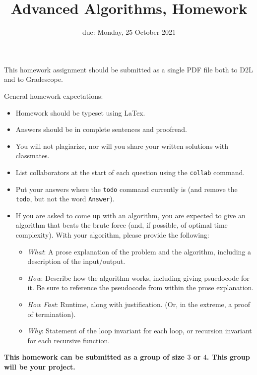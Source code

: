 \documentclass{article}
\title{Advanced Algorithms, Homework \hwnum}
\author{\todo{Your Name Here}}
\date{due: Monday, 25 October 2021}
\begin{document}
\maketitle

This homework assignment should be
submitted as a single PDF file both to D2L and to Gradescope.

General homework expectations:
\begin{itemize}
    \item Homework should be typeset using LaTex.
    \item Answers should be in complete sentences and proofread.
    \item You will not plagiarize, nor will you share your written solutions
        with classmates.
    \item List collaborators at the start of each question using the
        \texttt{collab} command.
    \item Put your answers where the \texttt{todo} command currently is (and
        remove the \texttt{todo}, but not the word \texttt{Answer}).
    \item If you are asked to come up with an algorithm, you are
        expected to give an algorithm that beats the brute force (and, if possible, of
        optimal time complexity). With your algorithm, please provide the following:
        \begin{itemize}
            \item \emph{What}: A prose explanation of the problem and the algorithm,
                including a description of the input/output.
            \item \emph{How}: Describe how the algorithm works, including giving
                psuedocode for it.  Be sure to reference the pseudocode
                from within the prose explanation.
            \item \emph{How Fast}: Runtime, along with justification.  (Or, in the
                extreme, a proof of termination).
            \item \emph{Why}: Statement of the loop invariant for each loop, or
                recursion invariant for each recursive function.
        \end{itemize}
\end{itemize}

{\bf
This homework can be submitted as a group of size $3$ or $4$.  This group will
be your project.
}

\collab{\todo{}}
\end{document}
